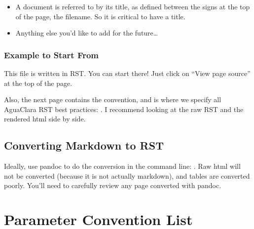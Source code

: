 \documentclass[letterpaper,10pt,english]{sphinxmanual}
\begin{document}
\begin{itemize}
\item {} 
A document is referred to by its title, as defined between the \sphinxcode{\sphinxupquote{*****}} signs at the top of the page,  the filename. So it is critical to have a title.

\item {} 
Anything else you’d like to add for the future…

\end{itemize}


\subsection{Example to Start From}
\label{\detokenize{Textbook_Creation_Help/rst_intro:example-to-start-from}}\label{\detokenize{Textbook_Creation_Help/rst_intro:heading-example-to-start-from}}
This file is written in RST. You can start there! Just click on “View page source” at the top of the page.

Also, the next page contains the convention, and is where we specify all AguaClara RST best practices: . I recommend looking at the raw RST and the rendered html side by side.


\section{Converting Markdown to RST}
\label{\detokenize{Textbook_Creation_Help/rst_intro:converting-markdown-to-rst}}\label{\detokenize{Textbook_Creation_Help/rst_intro:heading-converting-md-to-rst}}
Ideally, use pandoc to do the conversion in the command line: .
Raw html will not be converted (because it is not actually markdown), and tables are converted poorly.
You’ll need to carefully review any page converted with pandoc.


\chapter{Parameter Convention List}
\label{\detokenize{Textbook_Creation_Help/parameter_convention_list:parameter-convention-list}}\label{\detokenize{Textbook_Creation_Help/parameter_convention_list:title-parameter-convention-list}}\label{\detokenize{Textbook_Creation_Help/parameter_convention_list::doc}}
\end{document}
